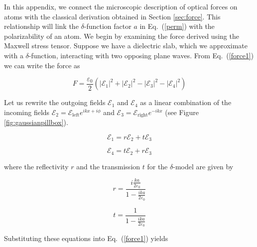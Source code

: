 \documentclass[twocolumn,english,pra,aps,superscriptaddress,floatfix]{revtex4-1}
\begin{document}
In this appendix, we connect the microscopic description of optical forces on atoms \cite{cohentannoudji} with the classical derivation obtained in Section \ref{sec:force}.  
This relationship will link the $\delta$-function factor $a$ in Eq.\ (\ref{perm}) with the polarizability of an atom. We begin by examining the force 
derived using the Maxwell stress tensor.  Suppose we have a dielectric slab, which we approximate with a $\delta$-function, interacting with two opposing plane waves. 
From Eq.\ (\ref{force1}) we can write the force as

\begin{equation}
F=\frac{\varepsilon_{0}}{2}\left(\left|\mathcal{E}_{1}\right|^{2}+\left|\mathcal{E}_{2}\right|^{2}-\left|\mathcal{E}_{3}\right|^{2}-\left|\mathcal{E}_{4}\right|^{2}\right)
\label{Gaussianforce}
\end{equation}

Let us rewrite the outgoing fields $\mathcal{E}_{1}$ and $\mathcal{E}_{4}$ as a linear combination of the incoming fields $\mathcal{E}_{2}=\mathcal{E}_{\mathrm{left}}e^{ikx+i\phi}$ 
and $\mathcal{E}_{3}=\mathcal{E}_{\mathrm{right}}e^{-ikx}$ (see Figure \ref{fig:gaussianpillbox}).

\begin{equation}
\mathcal{E}_{1}=r\mathcal{E}_{2}+t\mathcal{E}_{3}
\label{E1}
\end{equation}


\begin{equation}
\mathcal{E}_{4}=t\mathcal{E}_{2}+r\mathcal{E}_{3}
\label{E4}
\end{equation}

where the reflectivity $r$ and the transmission $t$ for the $\delta$-model are given by \cite{us}

\begin{equation}
r=\frac{i\frac{k a}{2\varepsilon_{0}}}{1-\frac{ik a}{2\varepsilon_{0}}}
\label{reflectivity}
\end{equation}


\begin{equation}
t=\frac{1}{1-\frac{ik a}{2\varepsilon_{0}}}
\label{transmission}
\end{equation}

Substituting these equations into Eq.\ (\ref{force1}) yields
\end{document}
